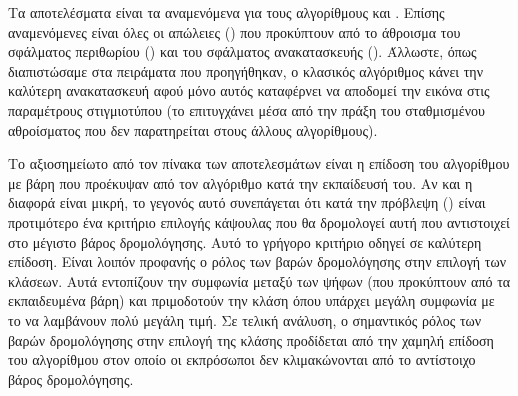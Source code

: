 \begin{table}[h]
    \begin{center}
    \end{center}
    \caption[]{\label{tab:special_experiments_algorithms_on_classic_model}Πειράματα στο  με την εκπαίδευση του αλγορίθμου στον κλασικό, δυναμικό αλγόριθμο δρομολόγησης με συμφωνία και τον έλεγχο του μοντέλου αυτού με τη χρήση των τεσσάρων αλγορίθμων δρομολόγησης.}
\end{table}

Τα αποτελέσματα είναι τα αναμενόμενα για τους αλγορίθμους  και . Επίσης αναμενόμενες είναι όλες οι απώλειες () που προκύπτουν από το άθροισμα του σφάλματος περιθωρίου () και του σφάλματος ανακατασκευής (). Άλλωστε, όπως διαπιστώσαμε στα πειράματα που προηγήθηκαν, ο κλασικός αλγόριθμος κάνει την καλύτερη ανακατασκευή αφού μόνο αυτός καταφέρνει να αποδομεί την εικόνα στις παραμέτρους στιγμιοτύπου (το επιτυγχάνει μέσα από την πράξη του σταθμισμένου αθροίσματος που δεν παρατηρείται στους άλλους αλγορίθμους).\par 

Το αξιοσημείωτο από τον πίνακα των αποτελεσμάτων είναι η επίδοση του αλγορίθμου  με βάρη που προέκυψαν από τον αλγόριθμο  κατά την εκπαίδευσή του. Αν και η διαφορά είναι μικρή, το γεγονός αυτό συνεπάγεται ότι κατά την πρόβλεψη () είναι προτιμότερο ένα κριτήριο επιλογής κάψουλας που θα δρομολογεί αυτή που αντιστοιχεί στο μέγιστο βάρος δρομολόγησης. Αυτό το γρήγορο κριτήριο οδηγεί σε καλύτερη επίδοση. Είναι λοιπόν προφανής ο ρόλος των βαρών δρομολόγησης στην επιλογή των κλάσεων. Αυτά εντοπίζουν την συμφωνία μεταξύ των ψήφων (που προκύπτουν από τα εκπαιδευμένα βάρη) και πριμοδοτούν την κλάση όπου υπάρχει μεγάλη συμφωνία με το να λαμβάνουν πολύ μεγάλη τιμή. Σε τελική ανάλυση, ο σημαντικός ρόλος των βαρών δρομολόγησης στην επιλογή της κλάσης προδίδεται από την χαμηλή επίδοση του αλγορίθμου  στον οποίο οι εκπρόσωποι δεν κλιμακώνονται από το αντίστοιχο βάρος δρομολόγησης.\par



